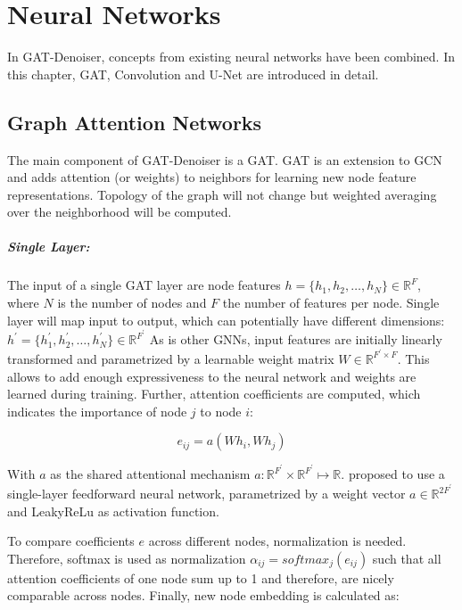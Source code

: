 \chapter{Neural Networks}
\label{sec:neural_networks}
In GAT-Denoiser, concepts from existing neural networks have been combined.
In this chapter, GAT, Convolution and U-Net are introduced in detail.

\section{Graph Attention Networks}
The main component of GAT-Denoiser is a GAT.
GAT is an extension to GCN and adds attention (or weights) to neighbors for learning new node feature representations. 
Topology of the graph will not change but weighted averaging over the neighborhood will be computed.

\paragraph{Single Layer:}
The input of a single GAT layer are node features $h = \{ h_1, h_2, \dots , h_N \} \in \mathbb{R}^F$, 
where $N$ is the number of nodes and $F$ the number of features per node. 
Single layer will map input to output, which can potentially have different dimensions: 
$h^{\prime} = \{ h_1^{\prime}, h_2^{\prime}, \dots, h_N^{\prime} \} \in \mathbb{R}^{F^{\prime}} $
As is other GNNs, input features are initially linearly transformed and parametrized by a learnable weight matrix 
$W \in \mathbb{R}^{F^{\prime} \times F}$. 
This allows to add enough expressiveness to the neural network and weights are learned during training.
Further, attention coefficients are computed, which indicates the importance of node $j$ to node $i$:

\begin{equation}
  e_{ij} = a(Wh_i, Wh_j)
\end{equation}

With $a$ as the shared attentional mechanism $a : \mathbb{R}^{F^{\prime}} \times \mathbb{R}^{F^{\prime}} \mapsto \mathbb{R}$.
\citet{GAT} proposed to use a single-layer feedforward neural network, parametrized by a weight vector $a \in \mathbb{R}^{2F^{\prime}}$
and LeakyReLu as activation function.

To compare coefficients $e$ across different nodes, normalization is needed.
Therefore, softmax is used as normalization $\alpha_{ij} = softmax_j(e_{ij})$ 
such that all attention coefficients of one node sum up to 1 and therefore, are nicely comparable across nodes.
Finally, new node embedding is calculated as:

